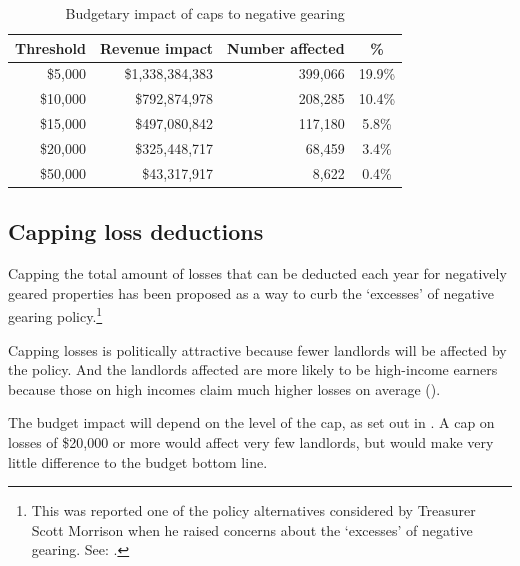 \begin{table}
\caption{Budgetary impact of caps to negative gearing}\label{tbl:cap-NG}
\begin{tabularx}{\linewidth}{rRRS}
  \toprule
{\textbf{Threshold}} & {\textbf{Revenue impact}} & {\textbf{Number affected}} & {\textbf{\%}} \\ 
  \midrule
  \$5,000 & \$1,338,384,383 & 399,066 & 19.9\% \\ 
  \$10,000 & \$792,874,978 & 208,285 & 10.4\% \\ 
  \$15,000 & \$497,080,842 & 117,180 & 5.8\% \\ 
  \$20,000 & \$325,448,717 & 68,459 & 3.4\% \\ 
  \$50,000 & \$43,317,917 & 8,622 & 0.4\% \\ 
   \bottomrule
\end{tabularx}

\end{table}

\subsection{Capping loss deductions}
Capping the total amount of losses that can be deducted each year for negatively geared properties has been proposed as a way to curb the ‘excesses’ of negative gearing policy.\footnote{This was reported one of the policy alternatives considered by Treasurer Scott Morrison when he raised concerns about the ‘excesses’ of negative gearing. See: \textcite{Coorey2016}.}



Capping losses is politically attractive because fewer landlords will be affected by the policy. 
And the landlords affected are more likely to be high-income earners because those on high incomes claim much higher losses on average (). 

The budget impact will depend on the level of the cap, as set out in . A cap on losses of \$20,000 or more would affect very few landlords, but would make very little difference to the budget bottom line.

